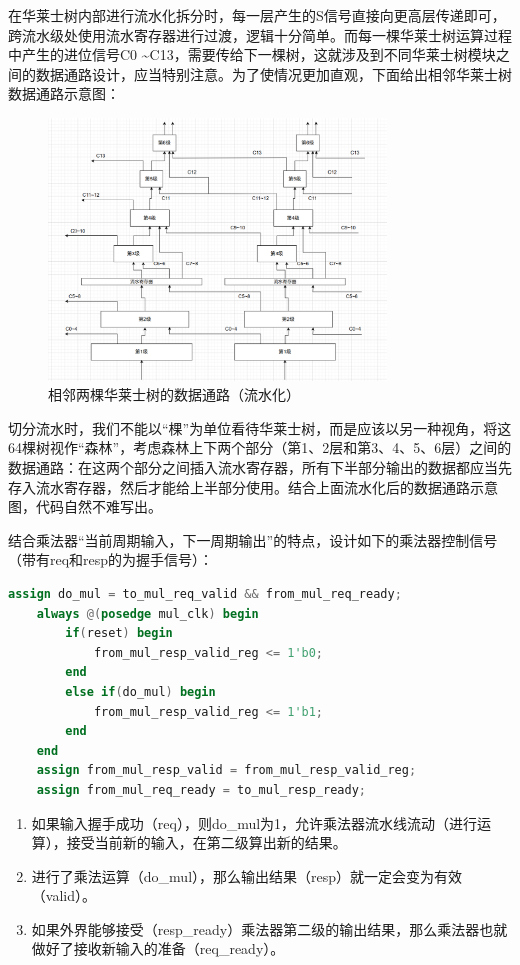 \documentclass[11pt]{article}
\begin{document}
在华莱士树内部进行流水化拆分时，每一层产生的S信号直接向更高层传递即可，跨流水级处使用流水寄存器进行过渡，逻辑十分简单。而每一棵华莱士树运算过程中产生的进位信号C0 \textasciitilde C13，需要传给下一棵树，这就涉及到不同华莱士树模块之间的数据通路设计，应当特别注意。为了使情况更加直观，下面给出相邻华莱士树数据通路示意图：

\begin{figure}[H]
    \centering
    \includegraphics[width=0.8\textwidth]{fig/华莱士流水示意图.png}
    \caption{相邻两棵华莱士树的数据通路（流水化）}
\end{figure}

切分流水时，我们不能以“棵”为单位看待华莱士树，而是应该以另一种视角，将这64棵树视作“森林”，考虑森林上下两个部分（第1、2层和第3、4、5、6层）之间的数据通路：在这两个部分之间插入流水寄存器，所有下半部分输出的数据都应当先存入流水寄存器，然后才能给上半部分使用。结合上面流水化后的数据通路示意图，代码自然不难写出。

结合乘法器“当前周期输入，下一周期输出”的特点，设计如下的乘法器控制信号（带有req和resp的为握手信号）：

\begin{lstlisting}[language=Verilog, caption={乘法器控制信号}]
    assign do_mul = to_mul_req_valid && from_mul_req_ready;
    always @(posedge mul_clk) begin
        if(reset) begin
            from_mul_resp_valid_reg <= 1'b0;
        end
        else if(do_mul) begin
            from_mul_resp_valid_reg <= 1'b1;
        end
    end
    assign from_mul_resp_valid = from_mul_resp_valid_reg;
    assign from_mul_req_ready = to_mul_resp_ready;
\end{lstlisting}

\begin{enumerate}
    \item 如果输入握手成功（req），则do_mul为1，允许乘法器流水线流动（进行运算），接受当前新的输入，在第二级算出新的结果。
    \item 进行了乘法运算（do_mul），那么输出结果（resp）就一定会变为有效（valid）。
    \item 如果外界能够接受（resp_ready）乘法器第二级的输出结果，那么乘法器也就做好了接收新输入的准备（req_ready）。
\end{enumerate}
\end{document}
